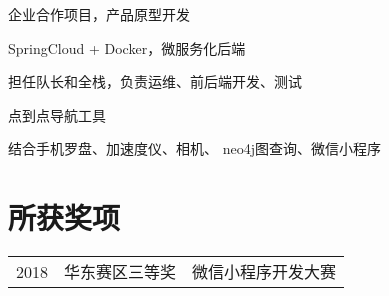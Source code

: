 \documentclass[]{deedy-resume-openfont}
\begin{document}
\begin{minipage}[t]{0.68\textwidth}
\sectionsep

\begin{tightemize}
    \item 企业合作项目，产品原型开发
    \item SpringCloud + Docker，微服务化后端
\end{tightemize}

\sectionsep

\begin{tightemize}
    \item 担任队长和全栈，负责运维、前后端开发、测试
    \item 点到点导航工具
    \item 结合手机罗盘、加速度仪、相机、 neo4j图查询、微信小程序
\end{tightemize}
\sectionsep




\section{所获奖项} 
\begin{tabular}{rll}
2018         & 华东赛区三等奖  & 微信小程序开发大赛 \\
\end{tabular}
\sectionsep


% 
% 

\end{minipage} 
\end{document}
